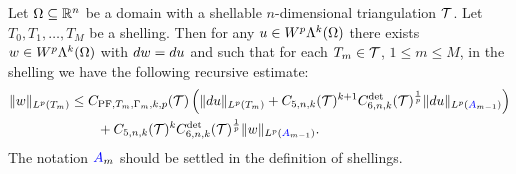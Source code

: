\documentclass[10pt,a4paper]{article}
\newcommand{\mwl}[1]{{\color{red}#1}}
\begin{document}
\begin{theorem}\label{theorem:poincarefriedrichsestimate:exterior}
    Let $\Omega \subseteq {\mathbb R}^{n}$ be a domain with a shellable $n$-dimensional triangulation ${\mathcal T}$.
    Let $T_0, T_1, \dots, T_M$ be a shelling.
    Then for any $u \in W^{p}\Lambda^{k}(\Omega)$ 
    there exists $w \in W^{p}\Lambda^{k}(\Omega)$ with $d w = d u$ 
    and such that for each $T_{m} \in {\mathcal T}$, $1 \leq m \leq M$, in the shelling
    we have the following recursive estimate: 
    \begin{align*}
        \| w \|_{L^{p}(T_{m})}
        &
        \leq  
        C_{{\rm PF},T_{m},\Gamma_{m},k,p}({\mathcal T}) 
        \left( 
            \| d u      \|_{L^{p}(T_{m})} 
            +
            C_{5,n,k}({\mathcal T})^{k+1} 
            C^{\det}_{6,n,k}({\mathcal T})^{\frac 1 p} 
            \| d u \|_{L^{p}({\color{blue}A}_{m-1})}
        \right)
        \\&\qquad
        + 
        C_{5,n,k}({\mathcal T})^{k} 
        C^{\det}_{6,n,k}({\mathcal T})^{\frac 1 p} 
        \| w \|_{L^{p}({\color{blue}A}_{m-1})}
        .
    \end{align*}
    \mwl{The notation ${\color{blue}A}_m$ should be settled in the definition of shellings.}
\end{theorem}
\end{document}
